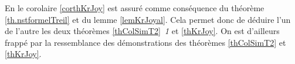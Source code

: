 En \clama le corolaire \ref{corthKrJoy} est assuré comme conséquence du théorème \ref{th.nstformelTreil}  et du lemme \ref{lemKrJoyal}. Cela permet donc de
déduire l'un de l'autre les deux théorèmes  \ref{thColSimT2}~\emph{1} et \ref{thKrJoy}.
On est d'ailleurs frappé par la ressemblance des démonstrations des théorèmes
\ref{thColSimT2} et \ref{thKrJoy}.
%
%

